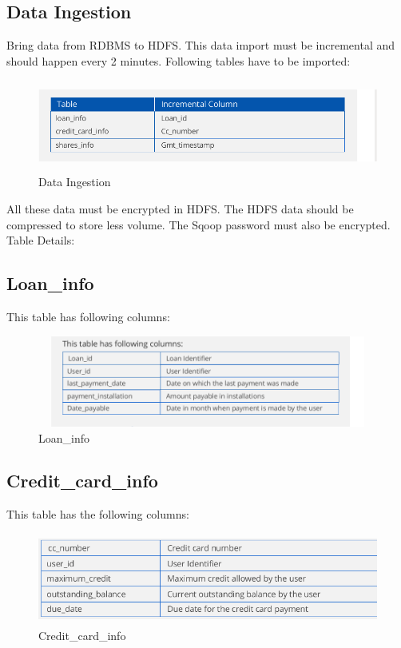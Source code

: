 \subsection{Data Ingestion}
Bring data from RDBMS to HDFS. This data import must be incremental
and should happen every 2 minutes.
\newline
Following tables have to be imported:
\begin{figure}[H]
\centering
\includegraphics[width=12cm,height=3cm]{dataingestion.png}
    \caption{Data Ingestion}
\end{figure}
\newline
All these data must be encrypted in HDFS. The HDFS data should be
compressed to store less volume.\newline
The Sqoop password must also be encrypted.
\newline
Table Details:
\subsection{Loan\_info}
This table has following columns:\newline
\begin{figure}[H]
\centering
\includegraphics[width=12cm,height=3cm]{loan_info.png}
    \caption{Loan\_info}
\end{figure}\newpage
\subsection{Credit\_card\_info}
This table has the following columns:
\begin{figure}[H]
\centering
\includegraphics[width=12cm,height=3cm]{creditcard1.png}
    \caption{Credit\_card\_info}
\end{figure}
\newline
